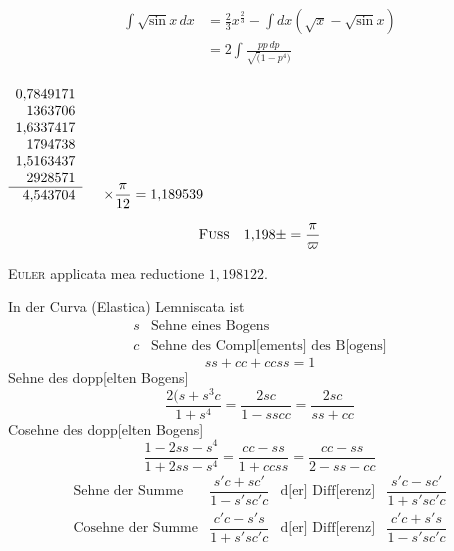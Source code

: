 \ClosingRule
{}
\noindent{\small [Schutzblatt]}
\[\begin{aligned}
\int\surd\sin x\,dx&=\tfrac23x^{\frac23}-\int dx(\surd x-\surd\sin x)\\
&=2\int\frac{pp\,dp}{\surd(1-p^4)}
\end{aligned}\]
\begin{flushright}
$\begin{array}{r}
0{,}7849171\\1363706\\1{,}6337417\\1794738\\1{,}5163437\\2928571\\\hline
4{,}543704
\end{array}\quad\begin{array}{l}\vphantom{0{,}7849171}\\\vphantom{1363706}\\\vphantom{1{,}6337417}\\\vphantom{1794738}\\\vphantom{1{,}5163437}\\\vphantom{2928571}\\\times\dfrac{\pi}{12}=1{,}189539\end{array}$
\end{flushright}
\[\text{\textsc{Fuss}}\quad1{,}198\pm=\frac{\pi}{\varpi}\]
\begin{center}\textsc{Euler} applicata mea reductione $1{,}198122.$\end{center}
\ClosingRule
\clearpage
{}
\noindent{\small [S. 16]}
\par\noindent\hspace*{\parindent}In der Curva (Elastica) Lemniscata ist
\[\begin{array}{ll}s&\text{Sehne eines Bogens}\\c&\text{Sehne des Compl[ements] des B[ogens]}\end{array}\]
\[ss+cc+ccss=1\]
\noindent Sehne des dopp[elten Bogens]
\[\frac{2(s+s^3c}{1+s^4}=\frac{2sc}{1-sscc}=\frac{2sc}{ss+cc}\]
\noindent Cosehne des dopp[elten Bogens]
\[\frac{1-2ss-s^4}{1+2ss-s^4}=\frac{cc-ss}{1+ccss}=\frac{cc-ss}{2-ss-cc}\]
\[\renewcommand{\arraystretch}{1.8}\begin{array}{llll}
\text{Sehne der Summe}&\dfrac{s'c+sc'}{1-s'sc'c}&\text{d[er] Diff[erenz]}&\dfrac{s'c-sc'}{1+s'sc'c}\\
\text{Cosehne der Summe}&\dfrac{c'c-s's}{1+s'sc'c}&\text{d[er] Diff[erenz]}&\dfrac{c'c+s's}{1-s'sc'c}
\end{array}\]

